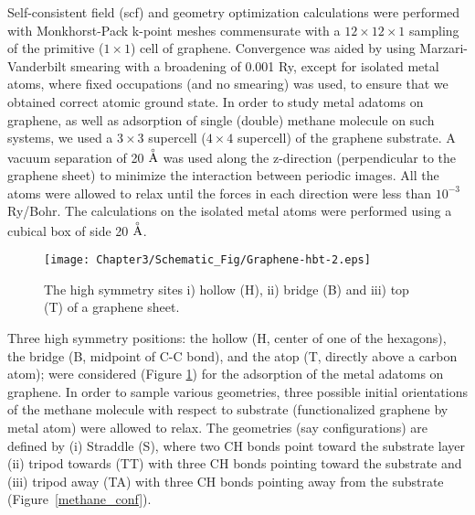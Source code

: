 Self-consistent field (scf) and geometry optimization calculations were performed with Monkhorst-Pack k-point meshes commensurate with a $12 \times 12 \times 1$ sampling of the primitive ($1 \times 1$) cell of graphene. Convergence was aided by using Marzari-Vanderbilt smearing with a broadening of 0.001 Ry, except for isolated metal atoms, where fixed occupations (and no smearing) was used, to ensure that we obtained correct atomic ground state. In order to study metal adatoms on graphene, as well as adsorption of single (double) methane molecule on such systems, we used a $3 \times 3$ supercell ($4 \times 4$ supercell) of the graphene substrate. A vacuum separation of 20 $\buildrel _\circ \over {\mathrm{A}}$ was used along the z-direction (perpendicular
to the graphene sheet) to minimize the interaction between periodic images. All the atoms were allowed to relax until the forces in each direction were less than $10^{-3}$ Ry/Bohr. The calculations on the isolated metal atoms were performed using a cubical box of side 20 $\buildrel _\circ \over {\mathrm{A}}$. 

\begin{figure}[h!]
\centering
\texttt{[image: Chapter3/Schematic\_Fig/Graphene-hbt-2.eps]}
\caption[The high symmetry sites i) hollow (H), ii) bridge (B) and iii) top (T) of a graphene sheet.]{ The high symmetry sites i) hollow (H), ii) bridge (B) and iii) top (T) of a graphene sheet.}
\label{graphene-hbt}
\end{figure}

Three high symmetry positions: the hollow (H, center of one of the hexagons), the bridge (B, midpoint of C-C bond), and the atop (T, directly above a carbon atom); were considered (Figure \ref{graphene-hbt}) for the
adsorption of the metal adatoms on graphene. In order to sample various geometries, three possible initial orientations of the methane molecule with respect to substrate (functionalized graphene by metal atom) were allowed to relax. The geometries (say configurations) are defined by (i) Straddle (S), where two CH bonds point toward the substrate layer (ii) tripod towards (TT) with three CH bonds pointing toward the substrate and (iii) tripod away (TA) with three CH bonds pointing away from the substrate (Figure~\ref{methane_conf}).

